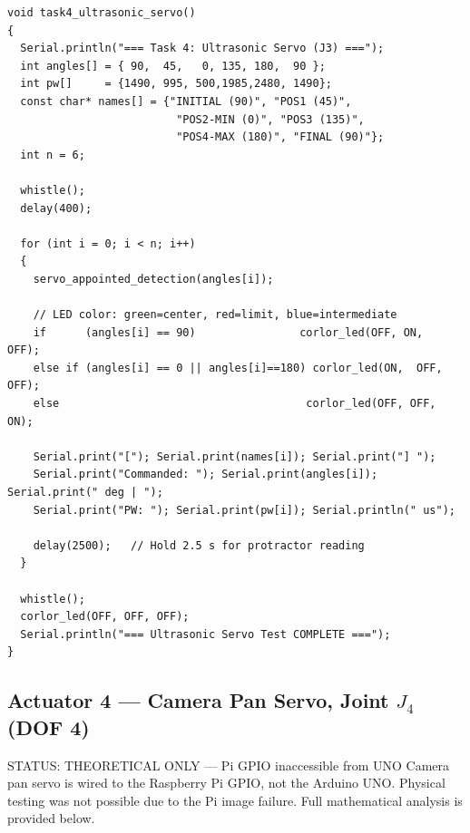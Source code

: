 \documentclass[12pt,a4paper]{article}
\begin{document}
\begin{lstlisting}[style=arduino,caption={Task 4 --- Ultrasonic servo: initial, 4 positions, final with logging}]
void task4_ultrasonic_servo()
{
  Serial.println("=== Task 4: Ultrasonic Servo (J3) ===");
  int angles[] = { 90,  45,   0, 135, 180,  90 };
  int pw[]     = {1490, 995, 500,1985,2480, 1490};
  const char* names[] = {"INITIAL (90)", "POS1 (45)",
                          "POS2-MIN (0)", "POS3 (135)",
                          "POS4-MAX (180)", "FINAL (90)"};
  int n = 6;

  whistle();
  delay(400);

  for (int i = 0; i < n; i++)
  {
    servo_appointed_detection(angles[i]);

    // LED color: green=center, red=limit, blue=intermediate
    if      (angles[i] == 90)                corlor_led(OFF, ON,  OFF);
    else if (angles[i] == 0 || angles[i]==180) corlor_led(ON,  OFF, OFF);
    else                                      corlor_led(OFF, OFF, ON);

    Serial.print("["); Serial.print(names[i]); Serial.print("] ");
    Serial.print("Commanded: "); Serial.print(angles[i]); Serial.print(" deg | ");
    Serial.print("PW: "); Serial.print(pw[i]); Serial.println(" us");

    delay(2500);   // Hold 2.5 s for protractor reading
  }

  whistle();
  corlor_led(OFF, OFF, OFF);
  Serial.println("=== Ultrasonic Servo Test COMPLETE ===");
}
\end{lstlisting}

\subsection{Actuator 4 --- Camera Pan Servo, Joint $J_4$ (DOF 4)}

\begin{dangerbox}{STATUS: THEORETICAL ONLY --- Pi GPIO inaccessible from UNO}
Camera pan servo is wired to the Raspberry Pi GPIO, not the Arduino UNO.
Physical testing was not possible due to the Pi image failure.
Full mathematical analysis is provided below.
\end{dangerbox}
\end{document}
